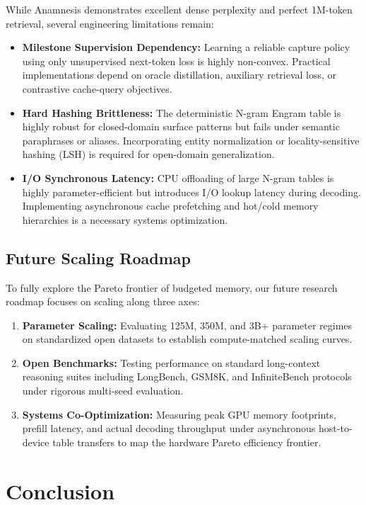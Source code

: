 \documentclass[11pt]{article}
\begin{document}
While Anamnesis demonstrates excellent dense perplexity and perfect 1M-token retrieval, several engineering limitations remain:
\begin{itemize}
    \item \textbf{Milestone Supervision Dependency:} Learning a reliable capture policy using only unsupervised next-token loss is highly non-convex. Practical implementations depend on oracle distillation, auxiliary retrieval loss, or contrastive cache-query objectives.
    \item \textbf{Hard Hashing Brittleness:} The deterministic N-gram Engram table is highly robust for closed-domain surface patterns but fails under semantic paraphrases or aliases. Incorporating entity normalization or locality-sensitive hashing (LSH) is required for open-domain generalization.
    \item \textbf{I/O Synchronous Latency:} CPU offloading of large N-gram tables is highly parameter-efficient but introduces I/O lookup latency during decoding. Implementing asynchronous cache prefetching and hot/cold memory hierarchies is a necessary systems optimization.
\end{itemize}

\subsection{Future Scaling Roadmap}

To fully explore the Pareto frontier of budgeted memory, our future research roadmap focuses on scaling along three axes:
\begin{enumerate}
    \item \textbf{Parameter Scaling:} Evaluating 125M, 350M, and 3B+ parameter regimes on standardized open datasets to establish compute-matched scaling curves.
    \item \textbf{Open Benchmarks:} Testing performance on standard long-context reasoning suites including LongBench, GSM8K, and InfiniteBench protocols under rigorous multi-seed evaluation.
    \item \textbf{Systems Co-Optimization:} Measuring peak GPU memory footprints, prefill latency, and actual decoding throughput under asynchronous host-to-device table transfers to map the hardware Pareto efficiency frontier.
\end{enumerate}

\section{Conclusion}
\end{document}

